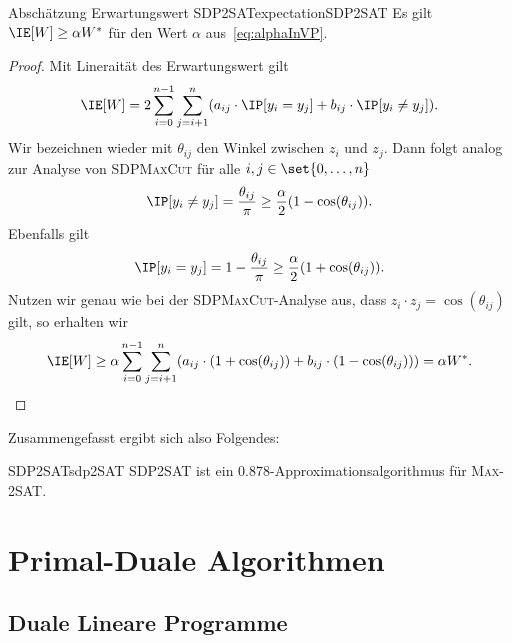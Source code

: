 \documentclass[language=ngerman,algolist]{TemplateLecture}
\begin{document}
\begin{lem}{Abschätzung Erwartungswert SDP2SAT}{expectationSDP2SAT}
    Es gilt $\IE[W] \geq \alpha W^*$ für den Wert $\alpha$ aus~\eqref{eq:alphaInVP}.
\end{lem}
\begin{proof}
    Mit Lineraität des Erwartungswert gilt 
    \begin{equation*}
        \IE[W] = 2\sum_{i = 0}^{n-1} \sum_{j = i + 1}^n (a_{ij} \cdot \IP[y_i = y_j] + b_{ij} \cdot \IP[y_i \neq y_j]).
    \end{equation*}
    Wir bezeichnen wieder mit $\theta_{ij}$ den Winkel zwischen $z_i$ und $z_j$. Dann folgt analog zur Analyse von \textsc{SDPMaxCut} für alle $i, j \in \set{0,\ldots,n}$
    \begin{equation*}
        \IP[y_i \neq y_j] = \frac{\theta_{ij}}{\pi} \geq \frac{\alpha}{2}(1 - \cos(\theta_{ij})).
    \end{equation*}
    Ebenfalls gilt
    \begin{equation*}
        \IP[y_i = y_j] = 1 - \frac{\theta_{ij}}{\pi} \geq \frac{\alpha}{2}(1 + \cos(\theta_{ij})).
    \end{equation*}
    Nutzen wir genau wie bei der \textsc{SDPMaxCut}-Analyse aus, dass $z_i \cdot z_j = \cos(\theta_{ij})$ gilt, so erhalten wir 
    \begin{equation*}
        \IE[W] \geq \alpha \sum_{i = 0}^{n-1} \sum_{j = i + 1}^n (a_{ij} \cdot (1 + \cos(\theta_{ij})) + b_{ij} \cdot (1 - \cos(\theta_{ij}))) = \alpha W^*. \qedhere
    \end{equation*}
\end{proof}

Zusammengefasst ergibt sich also Folgendes:

\begin{thm}{SDP2SAT}{sdp2SAT}
    \textsc{SDP2SAT} ist ein $0.878$-Approximationsalgorithmus für \textsc{Max-2SAT}.
\end{thm}


\addtocounter{chapter}{1}
\chapter{Primal-Duale Algorithmen}

\section{Duale Lineare Programme}
\end{document}

